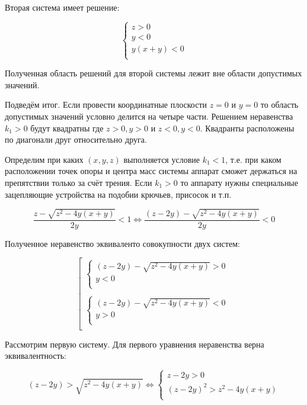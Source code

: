 Вторая система имеет решение:

$$
\left\{
\begin{array}{l}
    z>0\\
    y<0\\
    y(x+y)<0\\
\end{array}
\right.
$$

Полученная область решений для второй системы лежит вне области допустимых значений.

Подведём итог. Если провести координатные плоскости $z=0$ и $y=0$ то область допустимых значений условно делится на четыре части.
Решением неравенства $k_1>0$ будут квадратны где ${z>0,y>0}$ и ${z<0,y<0}$. Квадранты расположены по диагонали друг относительно друга.

Определим при каких $(x,y,z)$ выполняется условие $k_1<1$, т.е. при каком расположении точек опоры и центра масс системы аппарат сможет держаться на препятствии только за счёт трения. Если $k_1>0$ то аппарату нужны специальные зацепляющие устройства на подобии крючьев, присосок и т.п.

$$
\dfrac{z-\sqrt{z^2-4y(x+y)}}{2y}<1 \Leftrightarrow \dfrac{(z-2y)-\sqrt{z^2-4y(x+y)}}{2y}<0
$$

Полученное неравенство эквиваленто совокупности двух систем:

$$
\left[
\begin{array}{l}
    \left\{
    \begin{array}{l}
    (z-2y)-\sqrt{z^2-4y(x+y)}>0\\
    y<0\\
    \end{array}
    \right.\\
    \\
    \left\{
    \begin{array}{l}
    (z-2y)-\sqrt{z^2-4y(x+y)}<0\\
    y>0\\
    \end{array}
    \right.\\
\end{array}
\right.
$$

Рассмотрим первую систему. Для первого уравнения неравенства верна эквивалентность:

$$
(z-2y)>\sqrt{z^2-4y(x+y)} \Leftrightarrow
\left\{
    \begin{array}{l}
    z-2y>0\\
    (z-2y)^2>z^2-4y(x+y)\\
    \end{array}
\right.
$$

